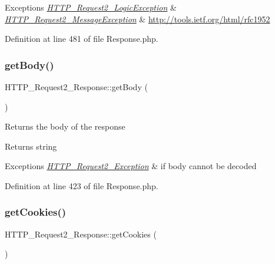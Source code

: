 \begin{DoxyExceptions}{Exceptions}
{\em \hyperlink{classHTTP__Request2__LogicException}{H\+T\+T\+P\+\_\+\+Request2\+\_\+\+Logic\+Exception}} & \\
\hline
{\em \hyperlink{classHTTP__Request2__MessageException}{H\+T\+T\+P\+\_\+\+Request2\+\_\+\+Message\+Exception}} & \hyperlink{}{http\+://tools.\+ietf.\+org/html/rfc1952}\\
\hline
\end{DoxyExceptions}


Definition at line 481 of file Response.\+php.

\mbox{\label{classHTTP__Request2__Response_a2aa534b9ea2994761e3b9260908ad678}} 
\subsubsection{\texorpdfstring{get\+Body()}{getBody()}}
{\footnotesize\ttfamily H\+T\+T\+P\+\_\+\+Request2\+\_\+\+Response\+::get\+Body (\begin{DoxyParamCaption}{ }\end{DoxyParamCaption})}

Returns the body of the response

\begin{DoxyReturn}{Returns}
string 
\end{DoxyReturn}

\begin{DoxyExceptions}{Exceptions}
{\em \hyperlink{classHTTP__Request2__Exception}{H\+T\+T\+P\+\_\+\+Request2\+\_\+\+Exception}} & if body cannot be decoded \\
\hline
\end{DoxyExceptions}


Definition at line 423 of file Response.\+php.

\mbox{\label{classHTTP__Request2__Response_a1c8c23d204f797dd18a31aa5a9c50414}} 
\subsubsection{\texorpdfstring{get\+Cookies()}{getCookies()}}
{\footnotesize\ttfamily H\+T\+T\+P\+\_\+\+Request2\+\_\+\+Response\+::get\+Cookies (\begin{DoxyParamCaption}{ }\end{DoxyParamCaption})}

